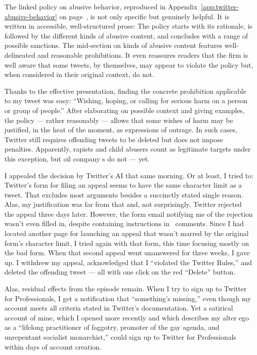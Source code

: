 \noindent{}The linked policy on abusive behavior, reproduced in
Appendix~\ref{app:twitter-abusive-behavior} on
page~\pageref{app:twitter-abusive-behavior}, is not only specific but genuinely
helpful. It is written in accessible, well-structured prose: The policy starts
with its rationale, is followed by the different kinds of abusive content, and
concludes with a range of possible sanctions. The mid-section on kinds of
abusive content features well-delineated and reasonable prohibitions. It even
reassures readers that the firm is well aware that some tweets, by themselves,
may appear to violate the policy but, when considered in their original context,
do not.

Thanks to the effective presentation, finding the concrete prohibition
applicable to my tweet was easy: ``Wishing, hoping, or calling for serious harm
on a person or group of people.'' After elaborating on possible context and
giving examples, the policy --- rather reasonably --- allows that some wishes of
harm may be justified, in the heat of the moment, as expressions of outrage. In
such cases, Twitter still requires offending tweets to be deleted but does not
impose penalties. Apparently, rapists and child abusers count as legitimate
targets under this exception, but oil company \CEO{}s do not --- yet.

I appealed the decision by Twitter's AI that same morning. Or at least, I tried
to: Twitter's form for filing an appeal seems to have the same character limit
as a tweet. That excludes most arguments besides a succinctly stated single
reason. Alas, my justification was far from that and, not surprisingly, Twitter
rejected the appeal three days later. However, the form email notifying me of
the rejection wasn't even filled in, despite containing instructions in \HTML\
comments. Since I had located another page for launching an appeal that wasn't
marred by the original form's character limit, I tried again with that form,
this time focusing mostly on the bad form. When that second appeal went
unanswered for three weeks, I gave up. I withdrew my appeal, acknowledged that I
``violated the Twitter Rules,'' and deleted the offending tweet --- all with one
click on the red ``Delete'' button.

Alas, residual effects from the episode remain. When I try to sign up to Twitter
for Professionals, I get a notification that ``something's missing,'' even
though my account meets all criteria stated in Twitter's documentation. Yet a
satirical account of mine, which I opened more recently and which describes my
alter ego as a ``lifelong practitioner of faggotry, promoter of the gay agenda,
and unrepentant socialist monarchist,'' could sign up to Twitter for
Professionals within days of account creation.


